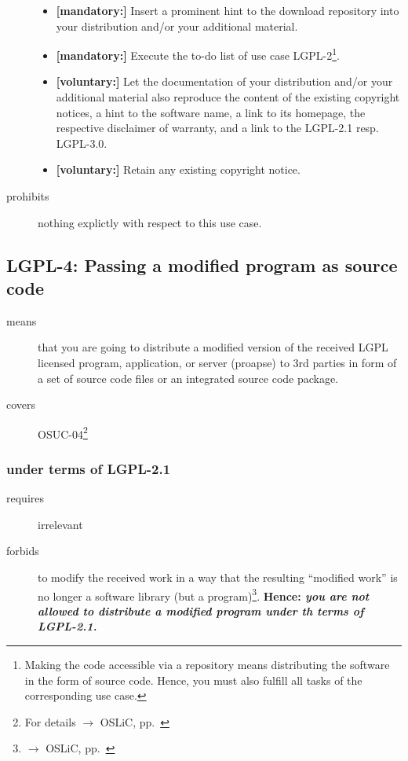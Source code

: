 \begin{description}
\begin{itemize}
  \item \textbf{[mandatory:]} Insert a prominent hint to the download repository
  into your distribution and/or your additional material.
  
  \item \textbf{[mandatory:]} Execute the to-do list of use case LGPL-2\footnote{
  Making the code accessible via a repository means distributing the software in
  the form of source code. Hence, you must also fulfill all tasks of the
  corresponding use case.}.
   
  \item \textbf{[voluntary:]} Let the documentation of your distribution and/or
  your additional material also reproduce the content of the existing
  copyright notices, a hint to the software name, a link to its homepage,
  the respective disclaimer of warranty, and a link to the LGPL-2.1 resp.
  LGPL-3.0.
  
  \item \textbf{[voluntary:]} Retain any existing copyright notice. 

\end{itemize}

\item[prohibits] nothing explictly with respect to this use case.

\end{description}

\subsection{LGPL-4: Passing a modified program as source code}
\label{OSUC-04-LGPL} 

\begin{description}
\item[means] that you are going to distribute a modified version of the received
LGPL licensed program, application, or server (proapse) to 3rd parties in form
of a set of source code files or an integrated source code package.
\item[covers] OSUC-04\footnote{For details $\rightarrow$ OSLiC, pp.\ \pageref{OSUC-04-DEF}}
\end{description}

\subsubsection{under terms of LGPL-2.1}

\begin{description}
  \item[requires] irrelevant
  \item[forbids] to modify the received work in a way that the resulting
  \enquote{modified work} is no longer a software library (but a
  program)\footnote{$\rightarrow$ OSLiC, pp.\ \pageref{}}. \textbf{Hence:
  \emph{you are not allowed to distribute a modified program under th terms of
  LGPL-2.1.}}
\end{description}

